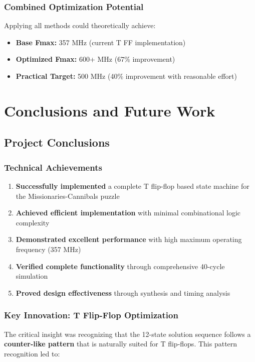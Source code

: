 \documentclass[12pt,letterpaper]{article}
\begin{document}
\subsubsection{Combined Optimization Potential}
Applying all methods could theoretically achieve:
\begin{itemize}
    \item \textbf{Base Fmax:} 357 MHz (current T FF implementation)
    \item \textbf{Optimized Fmax:} 600+ MHz (67\% improvement)
    \item \textbf{Practical Target:} 500 MHz (40\% improvement with reasonable effort)
\end{itemize}

\newpage

\section{Conclusions and Future Work}

\subsection{Project Conclusions}

\subsubsection{Technical Achievements}
\begin{enumerate}
    \item \textbf{Successfully implemented} a complete T flip-flop based state machine for the Missionaries-Cannibals puzzle
    \item \textbf{Achieved efficient implementation} with minimal combinational logic complexity
    \item \textbf{Demonstrated excellent performance} with high maximum operating frequency (357 MHz)
    \item \textbf{Verified complete functionality} through comprehensive 40-cycle simulation
    \item \textbf{Proved design effectiveness} through synthesis and timing analysis
\end{enumerate}

\subsubsection{Key Innovation: T Flip-Flop Optimization}
The critical insight was recognizing that the 12-state solution sequence follows a \textbf{counter-like pattern} that is naturally suited for T flip-flops. This pattern recognition led to:
\end{document}

